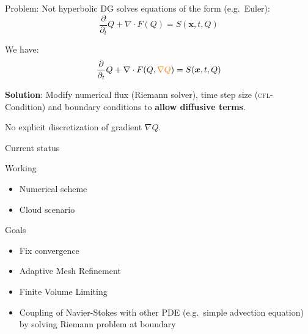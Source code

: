 \documentclass{beamer}
\begin{document}
\begin{frame}{Problem: Not hyperbolic}
  \textsc{DG} solves equations of the form (e.g.\ Euler):
  \begin{equation}
  \label{eq:conservation-law}
 \frac{\partial}{\partial_t}  Q + \nabla \cdot F(Q) = S(\bm{x}, t, Q)
\end{equation}

We have:
\begin{equation}
  \label{eq:conservation-law}
 \frac{\partial}{\partial_t}  Q + \nabla \cdot F(Q, \textcolor{orange}{\nabla Q}) = S(\bm{x}, t, Q)
\end{equation}

\textbf{Solution}:
Modify numerical flux (Riemann solver), time step size (\textsc{cfl}-Condition) and boundary conditions to \textbf{allow diffusive terms}.

\alert{No explicit discretization} of gradient $\nabla Q$.
\end{frame}

\begin{frame}{Current status}
  \begin{block}{Working}
  \begin{itemize}
  \item Numerical scheme
  \item Cloud scenario
  \end{itemize}
  \end{block}

  \begin{block}{Goals}
  \begin{itemize}
  \item Fix convergence
  \item Adaptive Mesh Refinement
  \item Finite Volume Limiting
  \item Coupling of Navier-Stokes with other PDE (e.g.\ simple advection equation) by solving Riemann problem at boundary
  \end{itemize}
  \end{block}
\end{frame}

\begin{frame}{Current status of Convergence-Tests}
  \begin{figure}[h]
    \centering
   \texttt{[image: \{l2\_error]}}
    \caption{Mesh-Size vs $L_2$ error }
    \label{fig:l2-error}
  \end{figure}
\end{frame}
\end{document}
